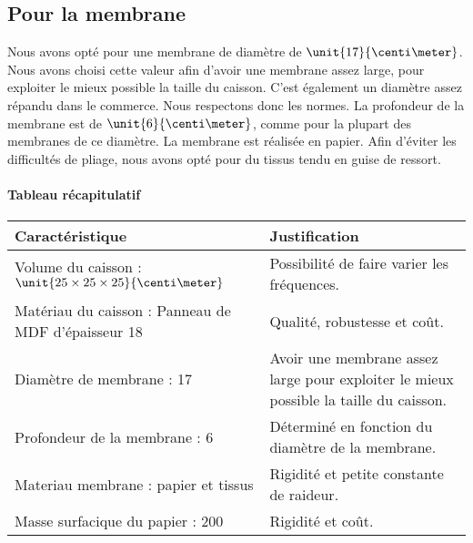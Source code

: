 \subsection{Pour la membrane}
Nous avons opté pour une membrane de diamètre de $\unit{17}{\centi\meter}$. Nous avons choisi cette valeur afin 
d'avoir une membrane assez large, pour exploiter le mieux possible la taille du caisson. C'est également un
diamètre assez répandu dans le commerce\cite{tlhp}. Nous respectons donc les normes.
La profondeur de la membrane est de $\unit{6}{\centi\meter}$, comme pour la plupart des membranes de ce
diamètre\cite{tlhp}. La membrane est réalisée en papier. Afin d'éviter les difficultés de pliage, nous avons opté pour
du tissus tendu en guise de ressort. 

\paragraph{Tableau récapitulatif}

\begin{table}
	\centering
	\begin{tabularx}{\textwidth}{|X|X|}
		\hline
			 \textbf{Caractéristique} & \textbf{Justification} \\
		\hline
			Volume du caisson : $\unit{25\times25\times25}{\centi\meter}$ & Possibilité de faire varier les fréquences.  \\
		\hline
			Matériau du caisson : Panneau de 	MDF
			d'épaisseur \unit{18}{\milli\meter} & Qualité, robustesse et coût. \\
		\hline
			Diamètre de membrane : \unit{17}{\centi\meter} & Avoir une membrane assez large pour exploiter le mieux possible la taille du caisson. \\
		\hline
			Profondeur de la membrane : \unit{6}{\centi\meter} & Déterminé en fonction du diamètre de la membrane. \\
		\hline
			Materiau membrane : papier et tissus & Rigidité et petite constante de raideur. \\
		\hline
			Masse surfacique du papier : \unit{200}{\gram\per\meter\squared} & Rigidité et coût. \\
		\hline
	\end{tabularx}
\end{table}

